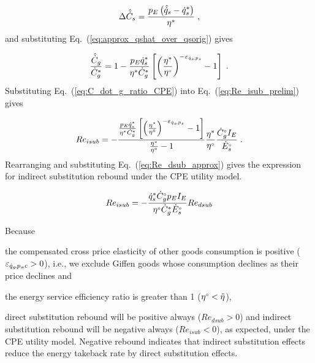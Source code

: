 \begin{equation}
  \Delta \hat{\dot{C}}_s = \frac{p_E \left( \hat{\dot{q}}_s - {\dot{q}}^*_s \right)}{{\eta}^*} \; ,
\end{equation}
%
and
substituting Eq.~(\ref{eq:approx_qshat_over_qsorig}) gives

\begin{equation} \label{eq:C_dot_g_ratio_CPE}
  \frac{\hat{\dot{C}}_g}{{\dot{C}}^*_g} = 1 - \frac{p_E {\dot{q}}^*_s}{{\eta}^*  {\dot{C}}^*_g} \left[ \left( \frac{{\eta}^*}{{}{\eta}^{\scriptscriptstyle \circ}} \right)^{-\varepsilon_{\dot{q}_s\!,p_s}} - 1 \right] \; .
\end{equation}
%
Substituting Eq.~(\ref{eq:C_dot_g_ratio_CPE})
into Eq.~(\ref{eq:Re_isub_prelim}) gives

\begin{equation}
  Re_{isub} = - \frac{\frac{p_E {\dot{q}}^*_s}{{\eta}^* {\dot{C}}^*_g}
                   \left[ \left( \frac{{\eta}^*}{{}{\eta}^{\scriptscriptstyle \circ}} \right)^{-\varepsilon_{\dot{q}_s\!,p_s}} - 1   \right] }
                {\frac{{\eta}^*}{{}{\eta}^{\scriptscriptstyle \circ}} - 1}
                \frac{{\eta}^*}{{}{\eta}^{\scriptscriptstyle \circ}}
                \frac{{}{\dot{C}}^{\scriptscriptstyle \circ}_g I_E}{{}{\dot{E}}^{\scriptscriptstyle \circ}_s} \; .
\end{equation}
%
Rearranging and substituting Eq.~(\ref{eq:Re_dsub_approx}) gives
the expression for indirect substitution rebound under the
CPE utility model.

\begin{equation} \label{eq:Re_isub_cpe}
  Re_{isub} = - \frac{{\dot{q}}^*_s {}{\dot{C}}^{\scriptscriptstyle \circ}_g p_E I_E}{{}{\eta}^{\scriptscriptstyle \circ} {\dot{C}}^*_g {}{\dot{E}}^{\scriptscriptstyle \circ}_s} Re_{dsub}
\end{equation}

Because %
\begin{enumerate*}[label={(\roman*)}]

  \item the compensated cross price elasticity
        of other goods consumption is positive ($\varepsilon_{\dot{q}_g\!,p_s\!,c} > 0$),
        i.e., we exclude Giffen goods
        \citep{Spiegel:1994aa}
        whose consumption declines
        as their price declines and

  \item the energy service efficiency ratio is greater than 1
        (${}{\eta}^{\scriptscriptstyle \circ} < \tilde{\eta}$),

\end{enumerate*}
%
direct substitution rebound will be positive always
($Re_{dsub} > 0$) and
indirect substitution rebound will be negative always
($Re_{isub} < 0$),
as expected, under the CPE utility model.
Negative rebound indicates that indirect substitution effects
reduce the energy takeback rate by direct substitution effects.


